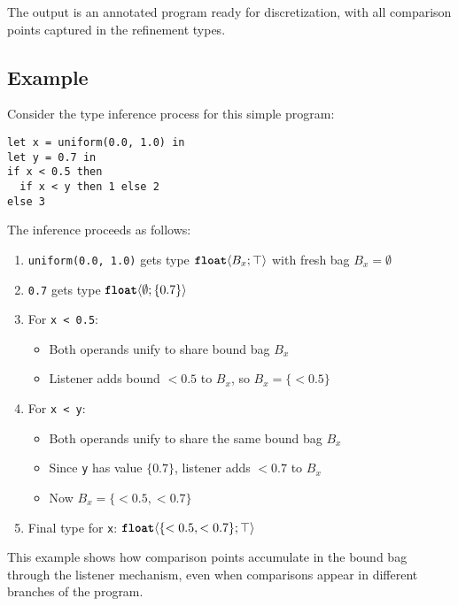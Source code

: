 The output is an annotated program ready for discretization, with all comparison points captured in the refinement types.

\subsection{Example}

Consider the type inference process for this simple program:
\begin{lstlisting}
let x = uniform(0.0, 1.0) in
let y = 0.7 in
if x < 0.5 then 
  if x < y then 1 else 2
else 3
\end{lstlisting}

The inference proceeds as follows:
\begin{enumerate}
    \item \texttt{uniform(0.0, 1.0)} gets type $\text{\ttfamily\bfseries float}\langle B_x; \top \rangle$ with fresh bag $B_x = \emptyset$
    \item \texttt{0.7} gets type $\text{\ttfamily\bfseries float}\langle \emptyset; \{0.7\} \rangle$
    \item For \texttt{x < 0.5}:
        \begin{itemize}
            \item Both operands unify to share bound bag $B_x$
            \item Listener adds bound $<0.5$ to $B_x$, so $B_x = \{<0.5\}$
        \end{itemize}
    \item For \texttt{x < y}:
        \begin{itemize}
            \item Both operands unify to share the same bound bag $B_x$
            \item Since \texttt{y} has value $\{0.7\}$, listener adds $<0.7$ to $B_x$
            \item Now $B_x = \{<0.5, <0.7\}$
        \end{itemize}
    \item Final type for \texttt{x}: $\text{\ttfamily\bfseries float}\langle \{<0.5, <0.7\}; \top \rangle$
\end{enumerate}

This example shows how comparison points accumulate in the bound bag through the listener mechanism, even when comparisons appear in different branches of the program.

